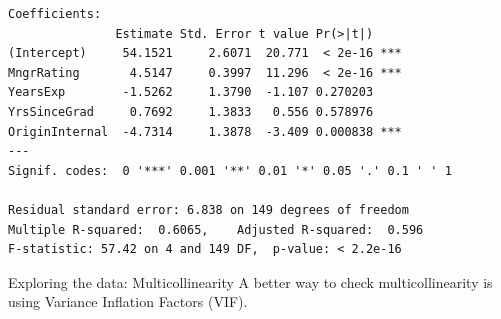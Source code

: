 \documentclass{beamer}\usepackage[]{graphicx}\usepackage[]{color}
\makeatletter
\newcommand{\hlopt}[1]{\textcolor[rgb]{1,0.894,0.769}{#1}}%
\newcommand{\hlstd}[1]{\textcolor[rgb]{1,0.894,0.769}{#1}}%
\newcommand{\hlkwd}[1]{\textcolor[rgb]{1,0.78,0.769}{#1}}%
\newenvironment{kframe}{%
 \def\at@end@of@kframe{}%
 \ifinner\ifhmode%
  \def\at@end@of@kframe{\end{minipage}}%
  \begin{minipage}{\columnwidth}%
 \fi\fi%
 \def\FrameCommand##1{\hskip\@totalleftmargin \hskip-\fboxsep
 \colorbox{shadecolor}{##1}\hskip-\fboxsep
     \hskip-\linewidth \hskip-\@totalleftmargin \hskip\columnwidth}%
 \MakeFramed {\advance\hsize-\width
   \@totalleftmargin\z@ \linewidth\hsize
   \@setminipage}}%
 {\par\unskip\endMakeFramed%
 \at@end@of@kframe}
\newenvironment{knitrout}{}{} %
\makeatother
\begin{document}
\begin{darkframes}
\begin{frame}[fragile]
\begin{knitrout}
\begin{kframe}
\begin{verbatim}
Coefficients:
               Estimate Std. Error t value Pr(>|t|)    
(Intercept)     54.1521     2.6071  20.771  < 2e-16 ***
MngrRating       4.5147     0.3997  11.296  < 2e-16 ***
YearsExp        -1.5262     1.3790  -1.107 0.270203    
YrsSinceGrad     0.7692     1.3833   0.556 0.578976    
OriginInternal  -4.7314     1.3878  -3.409 0.000838 ***
---
Signif. codes:  0 '***' 0.001 '**' 0.01 '*' 0.05 '.' 0.1 ' ' 1

Residual standard error: 6.838 on 149 degrees of freedom
Multiple R-squared:  0.6065,	Adjusted R-squared:  0.596 
F-statistic: 57.42 on 4 and 149 DF,  p-value: < 2.2e-16
\end{verbatim}
\end{kframe}
\end{knitrout}
\end{frame}
    
    
    
    
    
    

\begin{frame}[fragile]{Exploring the data: Multicollinearity}      
      A better way to check multicollinearity is using Variance Inflation Factors (VIF).
      

\end{frame}
\end{darkframes}
\end{document}

